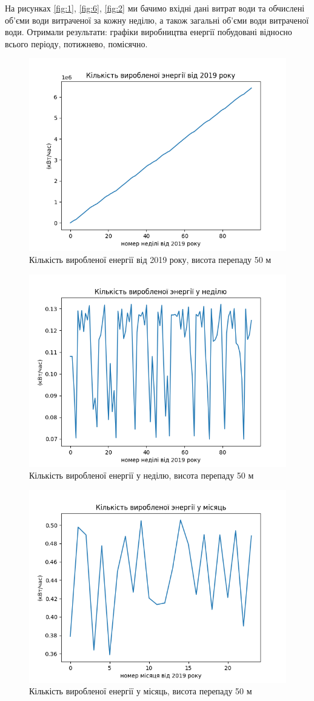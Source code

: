 \documentclass[12pt]{article}
\numberwithin{equation}{section}
\numberwithin{figure}{section}
\begin{document}
На рисунках \ref{fig:1}, \ref{fig:6}, \ref{fig:2} ми бачимо вхідні дані витрат води та обчислені об'єми води витраченої за кожну неділю, а також загальні об'єми води витраченої води. Отримали результати: графіки виробництва енергії побудовані відносно всього періоду, потижнево, помісячно.
\newpage

\begin{figure}[!htb]
	\centering
	\includegraphics[width=0.7\linewidth]{Figure_3.png}
	\caption{Кількість виробленої енергії від 2019 року, висота перепаду 50 м}\label{fig:3}
\end{figure}
\begin{figure}[!htb]
	\centering
	\includegraphics[width=0.7\linewidth]{Figure_4.png}
	\caption{Кількість виробленої енергії у неділю, висота перепаду 50 м}\label{fig:4}
\end{figure}
\begin{figure}[!htb]
	\centering
	\includegraphics[width=0.7\linewidth]{Figure_5.png}
	\caption{Кількість виробленої енергії у місяць, висота перепаду 50 м}\label{fig:5}
\end{figure}
\end{document}
